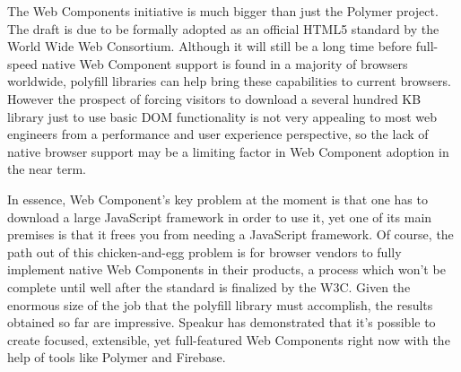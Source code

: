 The Web Components initiative is much bigger than just the Polymer project.
The draft is due to be formally adopted as an official HTML5 standard by the World Wide Web Consortium.
Although it will still be a long time before full-speed native Web Component support is found in a majority of browsers worldwide, 
polyfill libraries can help bring these capabilities to current browsers.
However the prospect of forcing visitors to download a several hundred KB library just to use basic DOM functionality is not very appealing to most web engineers from a performance and user experience perspective, 
so the lack of native browser support may be a limiting factor in Web Component adoption in the near term.

In essence, Web Component's key problem at the moment is that one has to download a large JavaScript framework in order to use it, 
yet one of its main premises is that it frees you from needing a JavaScript framework.
Of course, the path out of this chicken-and-egg problem is for browser vendors to fully implement native Web Components in their products,
a process which won't be complete until well after the standard is finalized by the W3C.
Given the enormous size of the job that the polyfill library must accomplish, the results obtained so far are impressive. 
Speakur has demonstrated that it's possible to create focused, extensible, yet full-featured Web Components right now with the help of tools like Polymer and Firebase.
